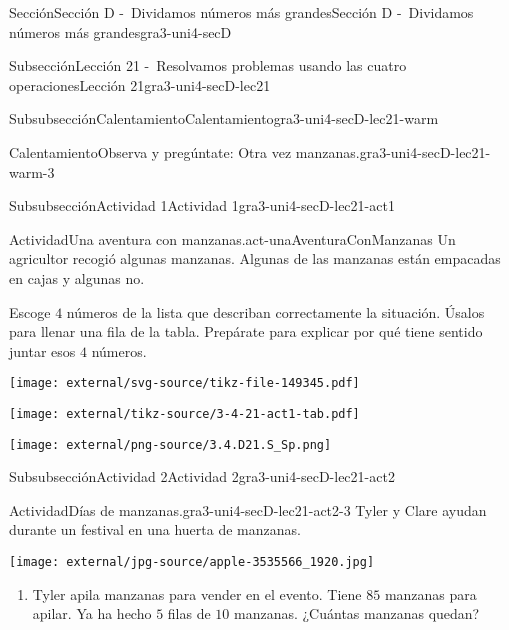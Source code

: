 \documentclass[twoside,10pt,]{article}
\begin{document}
\begin{sectionptx}{Sección}{Sección D -~Dividamos números más grandes}{}{Sección D -~Dividamos números más grandes}{}{}{gra3-uni4-secD}
\begin{subsectionptx}{Subsección}{Lección 21 -~Resolvamos problemas usando las cuatro operaciones}{}{Lección 21}{}{}{gra3-uni4-secD-lec21}
\begin{subsubsectionptx}{Subsubsección}{Calentamiento}{}{Calentamiento}{}{}{gra3-uni4-secD-lec21-warm}
\begin{exploration}{Calentamiento}{Observa y pregúntate: Otra vez manzanas.}{gra3-uni4-secD-lec21-warm-3}
\end{exploration}%
\end{subsubsectionptx}
%
%
\typeout{************************************************}
\typeout{************************************************}
%
\begin{subsubsectionptx}{Subsubsección}{Actividad 1}{}{Actividad 1}{}{}{gra3-uni4-secD-lec21-act1}
\begin{activity}{Actividad}{Una aventura con manzanas.}{act-unaAventuraConManzanas}%
Un agricultor recogió algunas manzanas. Algunas de las manzanas están empacadas en cajas y algunas no.%
\par
Escoge \(4\) números de la lista que describan correctamente la situación. Úsalos para llenar una fila de la tabla. Prepárate para explicar por qué tiene sentido juntar esos \(4\) números.%
\begin{image}{0}{1}{0}{}%
\texttt{[image: external/svg-source/tikz-file-149345.pdf]}
\end{image}%
\begin{image}{0}{1}{0}{}%
\texttt{[image: external/tikz-source/3-4-21-act1-tab.pdf]}
\end{image}%
\begin{image}{0.25}{0.5}{0.25}{}%
\texttt{[image: external/png-source/3.4.D21.S\_Sp.png]}
\end{image}%
\end{activity}%
\end{subsubsectionptx}
%
%
\typeout{************************************************}
\typeout{************************************************}
%
\begin{subsubsectionptx}{Subsubsección}{Actividad 2}{}{Actividad 2}{}{}{gra3-uni4-secD-lec21-act2}
\begin{activity}{Actividad}{Días de manzanas.}{gra3-uni4-secD-lec21-act2-3}%
Tyler y Clare ayudan durante un festival en una huerta de manzanas.%
\begin{image}{0.25}{0.5}{0.25}{}%
\texttt{[image: external/jpg-source/apple-3535566\_1920.jpg]}
\end{image}%
%
\begin{enumerate}
\item{}Tyler apila manzanas para vender en el evento. Tiene \(85\) manzanas para apilar. Ya ha hecho \(5\) filas de \(10\) manzanas. ¿Cuántas manzanas quedan?%
%
\begin{enumerate}

\end{enumerate}
\end{enumerate}
\end{activity}
\end{subsubsectionptx}
\end{subsectionptx}
\end{sectionptx}
\end{document}
